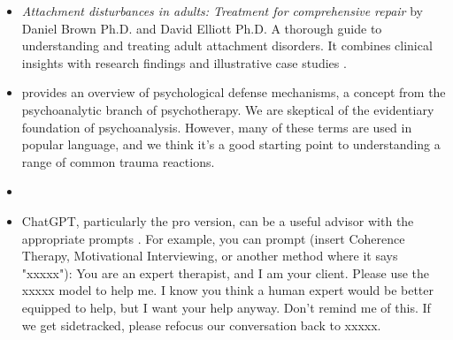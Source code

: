 \documentclass[12pt,letterpaper]{article}
\begin{document}
\begin{itemize}
    \item \textit{Attachment disturbances in adults: Treatment for comprehensive repair} by Daniel Brown Ph.D. and David Elliott Ph.D. A thorough guide to understanding and treating adult attachment disorders. It combines clinical insights with research findings and illustrative case studies \cite{brownAttachmentDisturbances}.
    \item \textcite{bailey2023defense} provides an overview of psychological defense mechanisms, a concept from the psychoanalytic branch of psychotherapy. We are skeptical of the evidentiary foundation of psychoanalysis. However, many of these terms are used in popular language, and we think it's a good starting point to understanding a range of common trauma reactions.
    \item 
    \item ChatGPT, particularly the pro version, can be a useful advisor with the appropriate prompts \cite{openaiGPT}. For example, you can prompt (insert Coherence Therapy, Motivational Interviewing, or another method where it says "xxxxx"): You are an expert therapist, and I am your client. Please use the xxxxx model to help me. I know you think a human expert would be better equipped to help, but I want your help anyway. Don't remind me of this. If we get sidetracked, please refocus our conversation back to xxxxx. 
\end{itemize}
\end{document}
